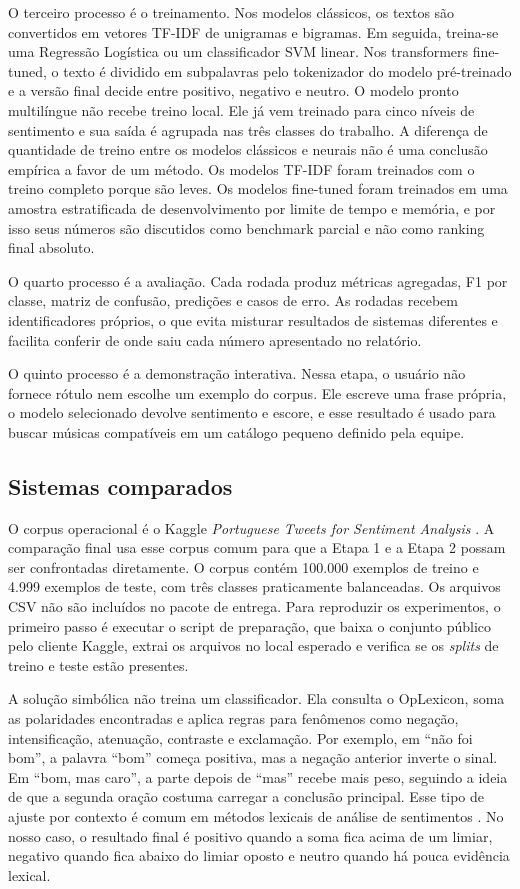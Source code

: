 \documentclass[11pt,a4paper]{article}
\begin{document}
O terceiro processo é o treinamento. Nos modelos clássicos, os textos são convertidos em vetores TF-IDF de unigramas e bigramas. Em seguida, treina-se uma Regressão Logística ou um classificador SVM linear. Nos transformers fine-tuned, o texto é dividido em subpalavras pelo tokenizador do modelo pré-treinado e a versão final decide entre positivo, negativo e neutro. O modelo pronto multilíngue não recebe treino local. Ele já vem treinado para cinco níveis de sentimento e sua saída é agrupada nas três classes do trabalho. A diferença de quantidade de treino entre os modelos clássicos e neurais não é uma conclusão empírica a favor de um método. Os modelos TF-IDF foram treinados com o treino completo porque são leves. Os modelos fine-tuned foram treinados em uma amostra estratificada de desenvolvimento por limite de tempo e memória, e por isso seus números são discutidos como benchmark parcial e não como ranking final absoluto.

O quarto processo é a avaliação. Cada rodada produz métricas agregadas, F1 por classe, matriz de confusão, predições e casos de erro. As rodadas recebem identificadores próprios, o que evita misturar resultados de sistemas diferentes e facilita conferir de onde saiu cada número apresentado no relatório.

O quinto processo é a demonstração interativa. Nessa etapa, o usuário não fornece rótulo nem escolhe um exemplo do corpus. Ele escreve uma frase própria, o modelo selecionado devolve sentimento e escore, e esse resultado é usado para buscar músicas compatíveis em um catálogo pequeno definido pela equipe.

\subsection{Sistemas comparados}

O corpus operacional é o Kaggle \emph{Portuguese Tweets for Sentiment Analysis} \citep{augustopKaggleTweets}. A comparação final usa esse corpus comum para que a Etapa 1 e a Etapa 2 possam ser confrontadas diretamente. O corpus contém 100.000 exemplos de treino e 4.999 exemplos de teste, com três classes praticamente balanceadas. Os arquivos CSV não são incluídos no pacote de entrega. Para reproduzir os experimentos, o primeiro passo é executar o script de preparação, que baixa o conjunto público pelo cliente Kaggle, extrai os arquivos no local esperado e verifica se os \emph{splits} de treino e teste estão presentes.

A solução simbólica não treina um classificador. Ela consulta o OpLexicon, soma as polaridades encontradas e aplica regras para fenômenos como negação, intensificação, atenuação, contraste e exclamação. Por exemplo, em ``não foi bom'', a palavra ``bom'' começa positiva, mas a negação anterior inverte o sinal. Em ``bom, mas caro'', a parte depois de ``mas'' recebe mais peso, seguindo a ideia de que a segunda oração costuma carregar a conclusão principal. Esse tipo de ajuste por contexto é comum em métodos lexicais de análise de sentimentos \citep{taboada2011lexicon,wiegand2010negation}. No nosso caso, o resultado final é positivo quando a soma fica acima de um limiar, negativo quando fica abaixo do limiar oposto e neutro quando há pouca evidência lexical.
\end{document}
